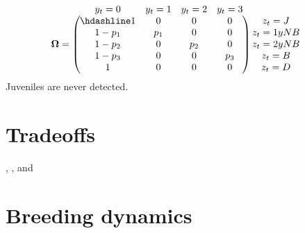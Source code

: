 \documentclass[
  12pt,
]{krantz}
\begin{document}
\[
\begin{matrix}
& \\
\mathbf{\Omega} =
  \left ( \vphantom{ \begin{matrix} 12 \\ 12 \\ 12 \\ 12 \\12 \end{matrix} } \right .
          \end{matrix}
          \hspace{-1.2em}
          \begin{matrix}
          y_t = 0 & y_t = 1 & y_t = 2 & y_t = 3\\ \hdashline
          1 & 0 & 0 & 0\\
          1 - p_1 & p_1 & 0 & 0\\
          1 - p_2 & 0 & p_2 & 0\\
          1 - p_3 & 0 & 0 & p_3\\
          1 & 0 & 0 & 0
          \end{matrix}
          \hspace{-0.2em}
          \begin{matrix}
          & \\
          \left . \vphantom{ \begin{matrix} 12 \\ 12 \\ 12 \\ 12 \\12 \end{matrix} } \right )
\begin{matrix}
z_t = J \\ z_t = 1yNB \\ z_t = 2yNB \\ z_t = B \\ z_t = D
\end{matrix}
\end{matrix}
\]
Juveniles are never detected.

\hypertarget{tradeoffs-1}{%
\section{Tradeoffs}\label{tradeoffs-1}}

\citet{morano_life-history_2013}, \citet{shefferson_life_2003}, and \citet{cruz-flores_sex-specific_nodate}

\hypertarget{breeding-dynamics}{%
\section{Breeding dynamics}\label{breeding-dynamics}}
\end{document}
